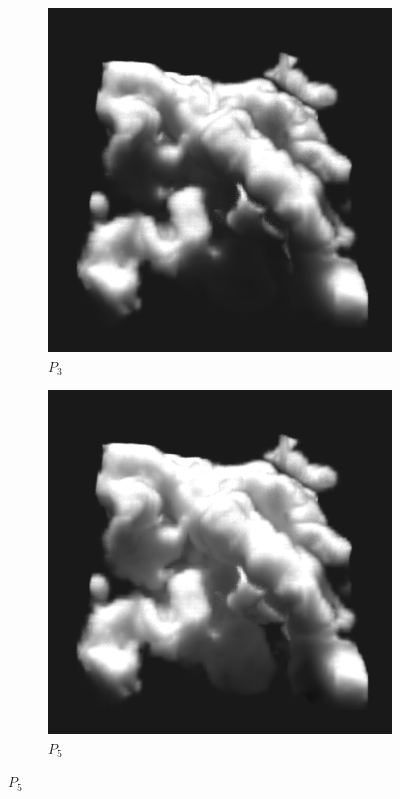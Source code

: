 \begin{figure}[h]
\begin{subfigure}{0.49\columnwidth}
\includegraphics[width=\columnwidth]{04_pn_method/results/nebulae_p3_ms.png}
\caption{$P_3$}
\label{fig:pn_results_nebulae1_P3}
\end{subfigure}%
\hspace{0.01\columnwidth}
\begin{subfigure}{0.49\columnwidth}
\includegraphics[width=\columnwidth]{04_pn_method/results/nebulae_p5_ms.png}
\caption{$P_5$}
\label{fig:pn_results_nebulae1_P5}
\end{subfigure}%


\end{figure}
